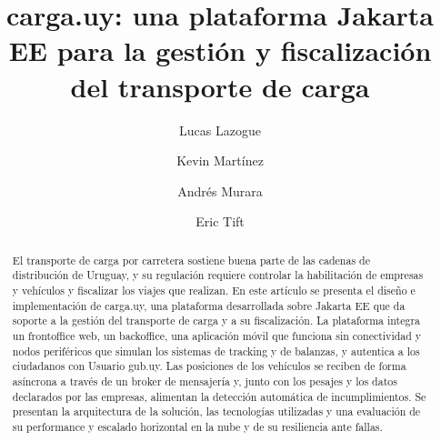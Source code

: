 \documentclass[runningheads]{llncs}
\begin{document}
%
\title{carga.uy: una plataforma Jakarta EE para la gestión y fiscalización del transporte de carga}
%
%
\author{Lucas Lazogue \and
Kevin Martínez \and
Andrés Murara \and
Eric Tift \\ }


%
\maketitle              %
%
\begin{abstract}
El transporte de carga por carretera sostiene buena parte de las cadenas de distribución de Uruguay, y su regulación requiere controlar la habilitación de empresas y vehículos y fiscalizar los viajes que realizan. En este artículo se presenta el diseño e implementación de carga.uy, una plataforma desarrollada sobre Jakarta EE que da soporte a la gestión del transporte de carga y a su fiscalización. La plataforma integra un frontoffice web, un backoffice, una aplicación móvil que funciona sin conectividad y nodos periféricos que simulan los sistemas de tracking y de balanzas, y autentica a los ciudadanos con Usuario gub.uy. Las posiciones de los vehículos se reciben de forma asíncrona a través de un broker de mensajería y, junto con los pesajes y los datos declarados por las empresas, alimentan la detección automática de incumplimientos. Se presentan la arquitectura de la solución, las tecnologías utilizadas y una evaluación de su performance y escalado horizontal en la nube y de su resiliencia ante fallas.

\sloppy
{}
\end{abstract}
%
%
%











\end{document}
